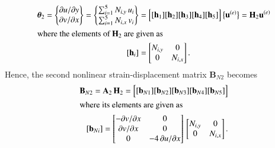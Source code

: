 \begin{subequations}
	\begin{align}
		\boldsymbol{\theta}_2 =  \begin{Bmatrix}
			\partial u / \partial y\\
			\partial v / \partial x
		\end{Bmatrix}
		= \begin{Bmatrix}
			\sum\nolimits_{i=1}^5 N_{i,y} \, u_i\\
			\sum\nolimits_{i=1}^5 N_{i,x} \, v_i
		\end{Bmatrix} 
		& = \begin{bmatrix}
			[\mathbf{h}_1] [\mathbf{h}_2] [\mathbf{h}_3] [\mathbf{h}_4] [\mathbf{h}_5] 
		\end{bmatrix} \bigl\{ \begin{matrix} \mathbf{u}^{(e)} \end{matrix} \bigr\}
		= \mathbf{H}_2  \mathbf{u}^{(e)}  \\
		\intertext{where the elements of $\mathbf{H}_2$ are given as}
		[\mathbf{h}_i] & = \begin{bmatrix}
			N_{i,y} &  0  \\
			0 & N_{i,x}  \end{bmatrix}.
	\end{align}
\end{subequations}
Hence, the second nonlinear strain-displacement matrix $\mathbf{B}_{N2}$ becomes
\begin{subequations}
	\begin{align}
		\mathbf{B}_{N2} = \mathbf{A}_2 \, \mathbf{H}_2 = \begin{bmatrix}
			[\mathbf{b}_{N1}] [\mathbf{b}_{N2}] [\mathbf{b}_{N3}] [\mathbf{b}_{N4}] [\mathbf{b}_{N5}] 
		\end{bmatrix}  \\
		\intertext{where its elements are given as}
		[\mathbf{b}_{Ni}] = \begin{bmatrix}
			- \partial v / \partial x &  0 \\
			\partial v / \partial x &  0 \\
			0 & -4 \, \partial u / \partial x  \end{bmatrix} \, \begin{bmatrix}
			N_{i,y} &  0  \\
			0 & N_{i,x}  \end{bmatrix}.
	\end{align}
\end{subequations}


